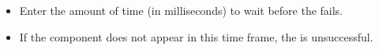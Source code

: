 \begin{itemize}
\item Enter the amount of time (in milliseconds) to wait before the \gdstep{} fails.
\item If the component does not appear in this time frame, the \gdstep{} is unsuccessful.
\end{itemize}

